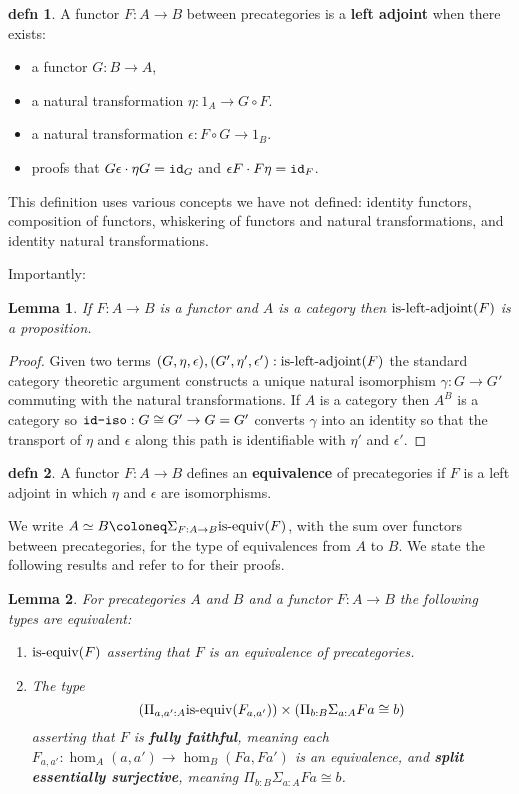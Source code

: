 \documentclass{amsart}
\theoremstyle{theorem}
\newtheorem*{lem}{Lemma}
\theoremstyle{definition}
\newtheorem*{defn}{defn}
\theoremstyle{remark}
\newcommand{\0}{\mathbbe{0}}
\newcommand{\1}{\mathbbe{1}}
\newcommand{\2}{\mathbbe{2}}
\newcommand{\3}{\mathbbe{3}}
\newcommand{\4}{\mathbbe{4}}
\newcommand{\term}[1]{{\textup{\texttt{#1}}}}
\newcommand{\type}[1]{{\textup{#1}}}
\newcommand{\id}{\term{id}}
\newcommand{\is}[1]{\type{is-{#1}}}
\begin{document}
\begin{defn} A functor $F \colon A \to B$ between precategories is a \textbf{left adjoint} when there exists:
\begin{itemize}
\item a functor $G \colon B \to A$,
\item a natural transformation $\eta \colon 1_A \to G \circ F$.
\item a natural transformation $\epsilon \colon F \circ G \to 1_B$.
\item proofs that $G\epsilon \cdot \eta G = \id_G$ and $\epsilon F \cdot F\eta = \id_F$.
\end{itemize}
\end{defn}

This definition uses various concepts we have not defined: identity functors, composition of functors, whiskering of functors and natural transformations, and identity natural transformations.

Importantly:

\begin{lem} If $F \colon A \to B$ is a functor and $A$ is a category then $\is{left-adjoint}(F)$ is a proposition.
\end{lem}
\begin{proof}
Given two terms $(G,\eta,\epsilon), (G',\eta',\epsilon') : \is{left-adjoint}(F)$ the standard category theoretic argument constructs a unique natural isomorphism $\gamma : G \to G'$ commuting with the natural transformations. If $A$ is a category then $A^B$ is a category so $\term{id-iso} : G \cong G' \to G = G'$ converts $\gamma$ into an identity so that the transport of $\eta$ and $\epsilon$ along this path is identifiable with $\eta'$ and $\epsilon'$.
\end{proof}

\begin{defn} A functor $F \colon A \to B$ defines an \textbf{equivalence} of precategories if $F$ is a left adjoint in which $\eta$ and $\epsilon$ are isomorphisms.
\end{defn}

We write $A \simeq B \coloneq \Sigma_{F: A \to B} \is{equiv}(F)$, with the sum over functors between precategories, for the type of equivalences from $A$ to $B$. We state the following results and refer to \cite{book-hott} for their proofs.

\begin{lem} For precategories $A$ and $B$ and a functor $F \colon A \to B$ the following types are equivalent:
\begin{enumerate}
\item $\is{equiv}(F)$ asserting that $F$ is an equivalence of precategories.
\item The type
\[ \left( \Pi_{a,a': A} \is{equiv}(F_{a,a'}) \right) \times \left( \Pi_{b:B} \Sigma_{a:A} Fa \cong b \right)\]
 asserting that $F$ is \textbf{fully faithful}, meaning each $F_{a,a'} : \hom_A(a,a') \to \hom_B(Fa,Fa')$ is an equivalence, and \textbf{split essentially surjective}, meaning $\Pi_{b:B} \Sigma_{a:A} Fa \cong b$.
\end{enumerate}
\end{lem}
\end{document}
